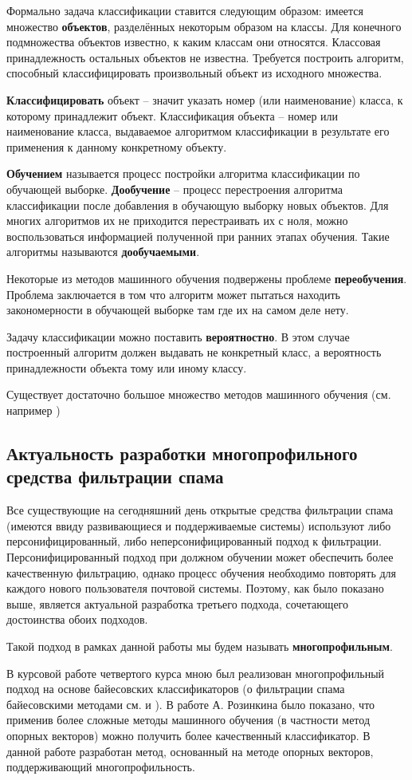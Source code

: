 Формально задача классификации ставится следующим образом: имеется множество \textbf{объектов}, разделённых некоторым образом на классы. Для конечного подмножества объектов известно, к каким классам они относятся. Классовая принадлежность остальных объектов не известна. Требуется построить алгоритм, способный классифицировать произвольный объект из исходного множества. 

\textbf{Классифицировать} объект – значит указать номер (или наименование) класса, к которому принадлежит объект. Классификация объекта – номер или  наименование класса, выдаваемое алгоритмом классификации в результате его применения к данному конкретному объекту.

\textbf{Обучением} называется процесс постройки алгоритма классификации по обучающей выборке. \textbf{Дообучение} – процесс перестроения алгоритма классификации после добавления в обучающую выборку новых объектов. Для многих алгоритмов их не приходится перестраивать их с ноля, можно воспользоваться информацией полученной при ранних этапах обучения. Такие алгоритмы называются \textbf{дообучаемыми}.

Некоторые из методов машинного обучения подвержены проблеме \textbf{переобучения}. Проблема заключается в том что алгоритм может пытаться находить закономерности в обучающей выборке там где их на самом деле нету.

Задачу классификации можно поставить \textbf{вероятностно}. В этом случае построенный  алгоритм должен выдавать не конкретный класс, а вероятность принадлежности объекта тому или иному классу.

Существует достаточно большое множество методов машинного обучения (см. например \cite{VORONCOV}) 

\subsection{Актуальность разработки многопрофильного средства фильтрации спама}

Все существующие на сегодняшний день открытые средства фильтрации спама (имеются ввиду развивающиеся и поддерживаемые системы) используют либо персонифицированный, либо неперсонифицированный подход к фильтрации. Персонифицированный подход при должном обучении может обеспечить более качественную фильтрацию, однако процесс обучения необходимо повторять для каждого нового пользователя почтовой системы. 
Поэтому, как было показано выше, является актуальной разработка третьего подхода, сочетающего достоинства обоих подходов. 

Такой подход в рамках данной работы мы будем называть \textbf{многопрофильным}. 

В курсовой работе четвертого курса \cite{PETROV10} мною был реализован многопрофильный подход на основе байесовских классификаторов (о фильтрации спама байесовскими методами см. \cite{PLANFORSPAM} и \cite{ROBINSON}). В работе А. Розинкина\cite{ROZ} было показано, что применив более сложные методы машинного обучения (в частности метод опорных векторов) можно получить более качественный классификатор. В данной работе разработан метод, основанный на методе опорных векторов, поддерживающий многопрофильность.
